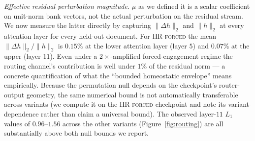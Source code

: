 \emph{Effective residual perturbation magnitude.} $\mu$ as we defined it is a scalar coefficient on unit-norm bank vectors, not the actual perturbation on the residual stream. We now measure the latter directly by capturing $\|\Delta h\|_2$ and $\|h\|_2$ at every attention layer for every held-out document. For \textsc{HR-forced} the mean $\|\Delta h\|_2 / \|h\|_2$ is $0.15\%$ at the lower attention layer (layer $5$) and $0.07\%$ at the upper (layer $11$). Even under a $2\times$-amplified forced-engagement regime the routing channel's contribution is well under $1\%$ of the residual norm --- a concrete quantification of what the ``bounded homeostatic envelope'' means empirically. Because the permutation null depends on the checkpoint's router-output geometry, the same numerical bound is not automatically transferable across variants (we compute it on the \textsc{HR-forced} checkpoint and note its variant-dependence rather than claim a universal bound). The observed layer-$11$ $L_1$ values of $0.96$--$1.56$ across the other variants (Figure~\ref{fig:routing}) are all substantially above both null bounds we report.

